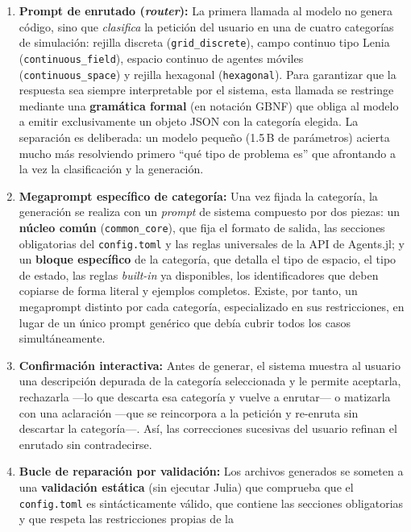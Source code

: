 \begin{enumerate}
    \item \textbf{Prompt de enrutado (\textit{router}):} La primera llamada al
    modelo no genera código, sino que \textit{clasifica} la petición del usuario
    en una de cuatro categorías de simulación: rejilla discreta
    (\texttt{grid\_discrete}), campo continuo tipo Lenia
    (\texttt{continuous\_field}), espacio continuo de agentes móviles
    (\texttt{continuous\_space}) y rejilla hexagonal (\texttt{hexagonal}). Para
    garantizar que la respuesta sea siempre interpretable por el sistema, esta
    llamada se restringe mediante una \textbf{gramática formal} (en notación
    GBNF) que obliga al modelo a emitir exclusivamente un objeto JSON con la
    categoría elegida. La separación es deliberada: un modelo pequeño
    (1.5\,B de parámetros) acierta mucho más resolviendo primero ``qué tipo de
    problema es'' que afrontando a la vez la clasificación y la generación.
    \item \textbf{Megaprompt específico de categoría:} Una vez fijada la
    categoría, la generación se realiza con un \textit{prompt} de sistema
    compuesto por dos piezas: un \textbf{núcleo común} (\texttt{common\_core}),
    que fija el formato de salida, las secciones obligatorias del
    \texttt{config.toml} y las reglas universales de la API de Agents.jl; y un
    \textbf{bloque específico} de la categoría, que detalla el tipo de espacio,
    el tipo de estado, las reglas \textit{built-in} ya disponibles, los
    identificadores que deben copiarse de forma literal y ejemplos completos.
    Existe, por tanto, un megaprompt distinto por cada categoría, especializado
    en sus restricciones, en lugar de un único prompt genérico que debía cubrir
    todos los casos simultáneamente.
    \item \textbf{Confirmación interactiva:} Antes de generar, el sistema muestra
    al usuario una descripción depurada de la categoría seleccionada y le permite
    aceptarla, rechazarla —lo que descarta esa categoría y vuelve a enrutar— o
    matizarla con una aclaración —que se reincorpora a la petición y re-enruta
    sin descartar la categoría—. Así, las correcciones sucesivas del usuario
    refinan el enrutado sin contradecirse.
    \item \textbf{Bucle de reparación por validación:} Los archivos generados se
    someten a una \textbf{validación estática} (sin ejecutar Julia) que comprueba
    que el \texttt{config.toml} es sintácticamente válido, que contiene las
    secciones obligatorias y que respeta las restricciones propias de la

\end{enumerate}
